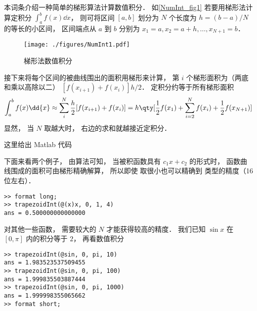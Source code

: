 

本词条介绍一种简单的梯形算法计算数值积分． 如\autoref{NumInt_fig1} 若要用梯形法计算定积分 $\int_a^b f(x) \dd{x}$， 则可将区间 $[a, b]$ 划分为 $N$ 个长度为 $h = (b-a)/N$ 的等长的小区间， 区间端点从 $a$ 到 $b$ 分别为 $x_1 = a, x_2 = a + h, \dots, x_{N+1} = b$．

\begin{figure}[ht]
\centering
\texttt{[image: ./figures/NumInt1.pdf]}
\caption{梯形法数值积分} \label{NumInt_fig1}
\end{figure}

接下来将每个区间的被曲线围出的面积用梯形来计算， 第 $i$ 个梯形面积为（两底和乘以高除以二）
$[f(x_{i+1}) + f(x_i)]h/2$． 定积分约等于所有梯形面积
\begin{equation}
\int_a^b f(x) \dd{x} \approx \sum_i^N  \frac h2 [f(x_{i+1}) + f(x_i)]
= h\qty[ \frac12 f(x_1) + \sum_{i = 2}^N f(x_i) + \frac12 f(x_{N+1})]
\end{equation}
显然， 当 $N$ 取越大时， 右边的求和就越接近定积分．

这里给出 Matlab 代码

下面来看两个例子， 由算法可知， 当被积函数具有 $c_1 x + c_2$ 的形式时， 函数曲线围成的面积可由梯形精确解算， 所以即使  取很小也可以精确到  类型的精度（16 位左右）．
\begin{lstlisting}[language=MatlabCom]
>> format long;
>> trapezoidInt(@(x)x, 0, 1, 4)
ans = 0.500000000000000
\end{lstlisting}
对其他一些函数， 需要较大的 $N$ 才能获得较高的精度． 我们已知 $\sin x$ 在 $[0, \pi]$ 内的积分等于 $2$， 再看数值积分
\begin{lstlisting}[language=MatlabCom]
>> trapezoidInt(@sin, 0, pi, 10)
ans = 1.983523537509455
>> trapezoidInt(@sin, 0, pi, 100)
ans = 1.999835503887444
>> trapezoidInt(@sin, 0, pi, 1000)
ans = 1.999998355065662
>> format short;
\end{lstlisting}
